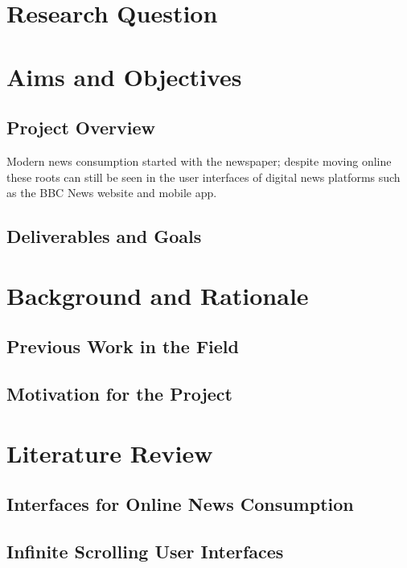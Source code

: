\documentclass[12pt,titlepage]{article}
\begin{document}
\tableofcontents
\newpage

\section{Research Question}



\section{Aims and Objectives}

  \subsection{Project Overview}

  Modern news consumption started with the newspaper; despite moving online these
roots can still be seen in the user interfaces of digital news platforms such as
the BBC News website and mobile app.

  \subsection{Deliverables and Goals}

\section{Background and Rationale}

  \subsection{Previous Work in the Field}

  \subsection{Motivation for the Project}

\section{Literature Review}

  \subsection{Interfaces for Online News Consumption}

  \subsection{Infinite Scrolling User Interfaces}
\end{document}
